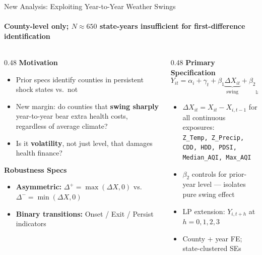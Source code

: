 \documentclass[aspectratio=169,11pt]{beamer}
\newcommand{\emphcolor}[1]{{\color{WarmOrange}\textbf{#1}}}
\newcommand{\tealtext}[1]{{\color{Teal}#1}}
\begin{document}
\begin{frame}{New Analysis: Exploiting Year-to-Year Weather Swings}
  \framesubtitle{County-level only; $N{\approx}650$ state-years insufficient for first-difference identification}
  \begin{columns}[T]
    \begin{column}{0.48\textwidth}
      \textbf{\tealtext{Motivation}}\\[0.15em]
      \footnotesize
      \begin{itemize}\itemsep0.12em
        \item Prior specs identify counties in persistent shock states vs.\ not
        \item New margin: do counties that \emphcolor{swing sharply} year-to-year bear extra health costs, regardless of average climate?
        \item Is it \emphcolor{volatility}, not just level, that damages health finance?
      \end{itemize}
      \vspace{0.2em}
      \textbf{\tealtext{Robustness Specs}}\\[0.1em]
      \footnotesize
      \begin{itemize}\itemsep0.10em
        \item \emphcolor{Asymmetric:} $\Delta^{+} = \max(\Delta X, 0)$ vs.\ $\Delta^{-} = \min(\Delta X, 0)$
        \item \emphcolor{Binary transitions:} Onset / Exit / Persist indicators
      \end{itemize}
    \end{column}
    \begin{column}{0.48\textwidth}
      \textbf{\tealtext{Primary Specification}}\\[0.15em]
      \footnotesize
      \[
        Y_{it} = \alpha_i + \gamma_t + \beta_1 \underbrace{\Delta X_{it}}_{\text{swing}} + \beta_2 \underbrace{X_{i,t-1}}_{\text{lagged level}} + \mathbf{X}_{it}'\delta + \varepsilon_{it}
      \]
      \begin{itemize}\itemsep0.12em
        \item $\Delta X_{it} = X_{it} - X_{i,t-1}$ for all continuous exposures:\\
              \texttt{Z\_Temp, Z\_Precip, CDD, HDD, PDSI, Median\_AQI, Max\_AQI}
        \item $\beta_2$ controls for prior-year level --- isolates pure swing effect
        \item LP extension: $Y_{i,t+h}$ at $h = 0, 1, 2, 3$
        \item County + year FE; state-clustered SEs
      \end{itemize}
    \end{column}
  \end{columns}
\end{frame}
\end{document}

